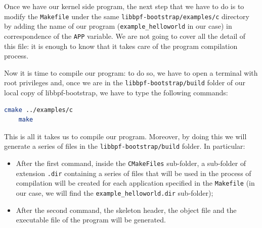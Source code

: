 Once we have our kernel side program, the next step that we have to do is to modify the \colorbox{backcolour}{\lstinline[style=commandline, language=bash, breaklines=true]|Makefile|} under the same \colorbox{backcolour}{\lstinline[style=commandline, language=bash, breaklines=true]|libbpf-bootstrap/examples/c|} directory by adding the name of our program (\colorbox{backcolour}{\lstinline[style=commandline, language=bash, breaklines=true]|example_helloworld|} in our case) in correspondence of the \colorbox{backcolour}{\lstinline[style=commandline, language=bash, breaklines=true]|APP|} variable.
We are not going to cover all the detail of this file: it is enough to know that it takes care of the program compilation process.

Now it is time to compile our program: to do so, we have to open a terminal with root privileges and, once we are in the \colorbox{backcolour}{\lstinline[style=commandline, language=bash, breaklines=true]|libbpf-bootstrap/build|} folder of our local copy of libbpf-bootstrap, we have to type the following commands:

\begin{lstlisting}[style=commandline, language=bash, caption={Programs compilation commands in libbpf-bootstrap.}]
	cmake ../examples/c
	make
\end{lstlisting}

This is all it takes us to compile our program.
Moreover, by doing this we will generate a series of files in the \colorbox{backcolour}{\lstinline[style=commandline, language=bash, breaklines=true]|libbpf-bootstrap/build|} folder.
In particular:

\begin{itemize}
	\item 
		After the first command, inside the \colorbox{backcolour}{\lstinline[style=commandline, language=bash, breaklines=true]|CMakeFiles|} sub-folder, a sub-folder of extension \colorbox{backcolour}{\lstinline[style=commandline, language=bash, breaklines=true]|.dir|} containing a series of files that will be used in the process of compilation will be created for each application specified in the \colorbox{backcolour}{\lstinline[style=commandline, language=bash, breaklines=true]|Makefile|} (in our case, we will find the \colorbox{backcolour}{\lstinline[style=commandline, language=bash, breaklines=true]|example_helloworld.dir|} sub-folder);
	\item 
		After the second command, the skeleton header, the object file and the executable file of the program will be generated.
\end{itemize}

